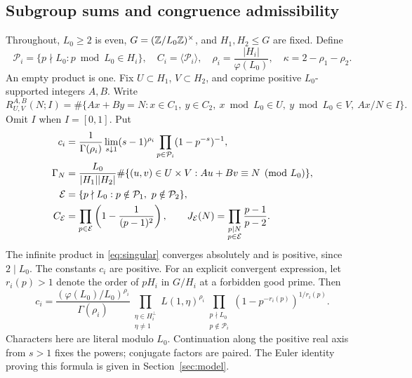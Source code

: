 \subsection{Subgroup sums and congruence admissibility}
Throughout, \(L_0\ge2\) is even,
\(G=(\mathbb Z/L_0\mathbb Z)^\times\), and \(H_1,H_2\le G\) are fixed.
Define
\[
 \mathcal P_i=\{p\nmid L_0:p\bmod L_0\in H_i\},\quad
 C_i=\langle\mathcal P_i\rangle,\quad
 \rho_i=\frac{|H_i|}{\varphi(L_0)},\quad
 \kappa=2-\rho_1-\rho_2.
\]
An empty product is one. Fix \(U\subset H_1\), \(V\subset H_2\),
and coprime positive \(L_0\)-supported integers \(A,B\).
Write
\[
 R_{U,V}^{A,B}(N;I)=\#\{Ax+By=N:x\in C_1,\ y\in C_2,
      \ x\bmod L_0\in U,\ y\bmod L_0\in V,\ Ax/N\in I\}.
\]
Omit \(I\) when \(I=[0,1]\). Put
\begin{align}
 c_i&=\frac{1}{\Gamma(\rho_i)}
    \lim_{s\downarrow1}(s-1)^{\rho_i}
              \prod_{p\in\mathcal P_i}(1-p^{-s})^{-1},\label{eq:marginal}\\
 \Gamma_N&=\frac{L_0}{|H_1||H_2|}
    \#\{(u,v)\in U\times V:Au+Bv\equiv N\pmod{L_0}\},\label{eq:finite}\\
 \mathcal E&=\{p\nmid L_0:p\notin\mathcal P_1,
                                  \ p\notin\mathcal P_2\},\notag\\
 C_{\mathcal E}&=\prod_{p\in\mathcal E}
               \left(1-\frac{1}{(p-1)^2}\right),\qquad
 J_{\mathcal E}(N)=\prod_{\substack{p\mid N\\p\in\mathcal E}}
                              \frac{p-1}{p-2}.\label{eq:singular}
\end{align}
The infinite product in \eqref{eq:singular} converges absolutely and
is positive, since \(2\mid L_0\). The constants \(c_i\) are positive.
For an explicit convergent expression, let \(r_i(p)>1\) denote the
order of \(pH_i\) in \(G/H_i\) at a forbidden good prime. Then
\begin{equation}\label{eq:marginal-product}
 c_i=\frac{(\varphi(L_0)/L_0)^{\rho_i}}{\Gamma(\rho_i)}
 \prod_{\substack{\eta\in H_i^\perp\\\eta\ne1}}L(1,\eta)^{\rho_i}
 \prod_{\substack{p\nmid L_0\\p\notin\mathcal P_i}}
                     (1-p^{-r_i(p)})^{1/r_i(p)}.
\end{equation}
Characters here are literal modulo \(L_0\). Continuation along the
positive real axis from \(s>1\) fixes the powers; conjugate factors
are paired. The Euler identity proving this formula is given in
Section~\ref{sec:model}.

